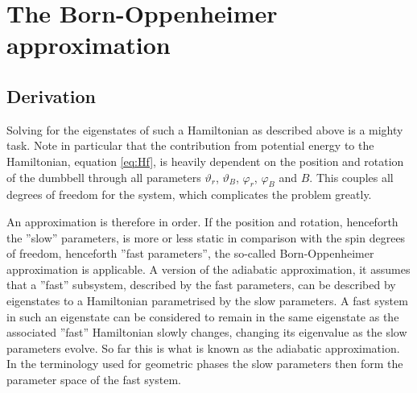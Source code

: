 \documentclass[a4paper]{article}
\begin{document}
\section{The Born-Oppenheimer approximation}
\subsection{Derivation}
Solving for the eigenstates of such a Hamiltonian as described above is a mighty task. Note
in particular that the contribution from potential energy to the Hamiltonian, equation
\ref{eq:Hf}, is heavily dependent on the position and rotation of the dumbbell through all
parameters \(\vartheta_r \), \(\vartheta_B\), \(\varphi_r\),
\(\varphi_B\) and \(B\). This couples all degrees of freedom for the system, which complicates
the problem greatly.

An approximation is therefore in order. If the position and rotation,
henceforth the ''slow'' parameters,
is more or less static in comparison with the spin degrees of freedom, henceforth ''fast
parameters'', the so-called Born-Oppenheimer approximation is applicable. A version of the
adiabatic approximation, it assumes that a ''fast'' subsystem, described by the fast
parameters, can be described by eigenstates to a Hamiltonian parametrised by the slow
parameters. A fast system in such an eigenstate can be considered to remain in the same
eigenstate as the associated ''fast'' Hamiltonian slowly changes, changing its
eigenvalue as the slow parameters evolve. So far this is what is known as the adiabatic
approximation\cite{adiab}. In the terminology used for geometric phases the slow
parameters then form the parameter space of the fast system. %
\end{document}
